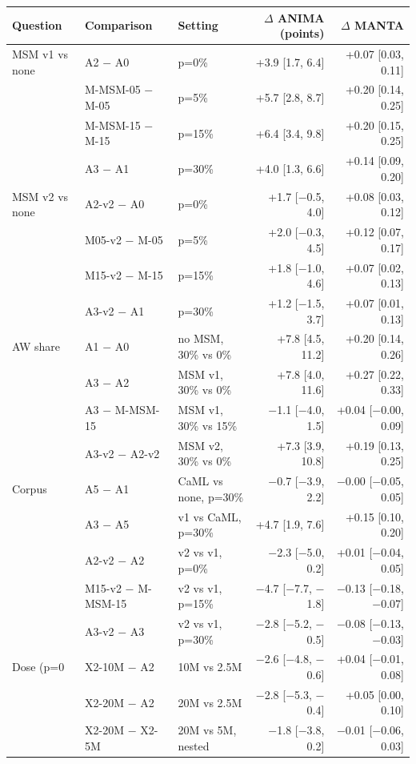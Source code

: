 \begin{tabular}{lllrr}
\toprule
Question & Comparison & Setting & $\Delta$ ANIMA (points) & $\Delta$ MANTA \\
\midrule
MSM v1 vs none & A2 $-$ A0 & p=0\% & +3.9 [1.7, 6.4] & +0.07 [0.03, 0.11] \\
 & M-MSM-05 $-$ M-05 & p=5\% & +5.7 [2.8, 8.7] & +0.20 [0.14, 0.25] \\
 & M-MSM-15 $-$ M-15 & p=15\% & +6.4 [3.4, 9.8] & +0.20 [0.15, 0.25] \\
 & A3 $-$ A1 & p=30\% & +4.0 [1.3, 6.6] & +0.14 [0.09, 0.20] \\
\midrule
MSM v2 vs none & A2-v2 $-$ A0 & p=0\% & +1.7 [$-$0.5, 4.0] & +0.08 [0.03, 0.12] \\
 & M05-v2 $-$ M-05 & p=5\% & +2.0 [$-$0.3, 4.5] & +0.12 [0.07, 0.17] \\
 & M15-v2 $-$ M-15 & p=15\% & +1.8 [$-$1.0, 4.6] & +0.07 [0.02, 0.13] \\
 & A3-v2 $-$ A1 & p=30\% & +1.2 [$-$1.5, 3.7] & +0.07 [0.01, 0.13] \\
\midrule
AW share & A1 $-$ A0 & no MSM, 30\% vs 0\% & +7.8 [4.5, 11.2] & +0.20 [0.14, 0.26] \\
 & A3 $-$ A2 & MSM v1, 30\% vs 0\% & +7.8 [4.0, 11.6] & +0.27 [0.22, 0.33] \\
 & A3 $-$ M-MSM-15 & MSM v1, 30\% vs 15\% & $-$1.1 [$-$4.0, 1.5] & +0.04 [$-$0.00, 0.09] \\
 & A3-v2 $-$ A2-v2 & MSM v2, 30\% vs 0\% & +7.3 [3.9, 10.8] & +0.19 [0.13, 0.25] \\
\midrule
Corpus & A5 $-$ A1 & CaML vs none, p=30\% & $-$0.7 [$-$3.9, 2.2] & $-$0.00 [$-$0.05, 0.05] \\
 & A3 $-$ A5 & v1 vs CaML, p=30\% & +4.7 [1.9, 7.6] & +0.15 [0.10, 0.20] \\
 & A2-v2 $-$ A2 & v2 vs v1, p=0\% & $-$2.3 [$-$5.0, 0.2] & +0.01 [$-$0.04, 0.05] \\
 & M15-v2 $-$ M-MSM-15 & v2 vs v1, p=15\% & $-$4.7 [$-$7.7, $-$1.8] & $-$0.13 [$-$0.18, $-$0.07] \\
 & A3-v2 $-$ A3 & v2 vs v1, p=30\% & $-$2.8 [$-$5.2, $-$0.5] & $-$0.08 [$-$0.13, $-$0.03] \\
\midrule
Dose (p=0%
 & X2-10M $-$ A2 & 10M vs 2.5M & $-$2.6 [$-$4.8, $-$0.6] & +0.04 [$-$0.01, 0.08] \\
 & X2-20M $-$ A2 & 20M vs 2.5M & $-$2.8 [$-$5.3, $-$0.4] & +0.05 [0.00, 0.10] \\
 & X2-20M $-$ X2-5M & 20M vs 5M, nested & $-$1.8 [$-$3.8, 0.2] & $-$0.01 [$-$0.06, 0.03] \\
\bottomrule
\end{tabular}
